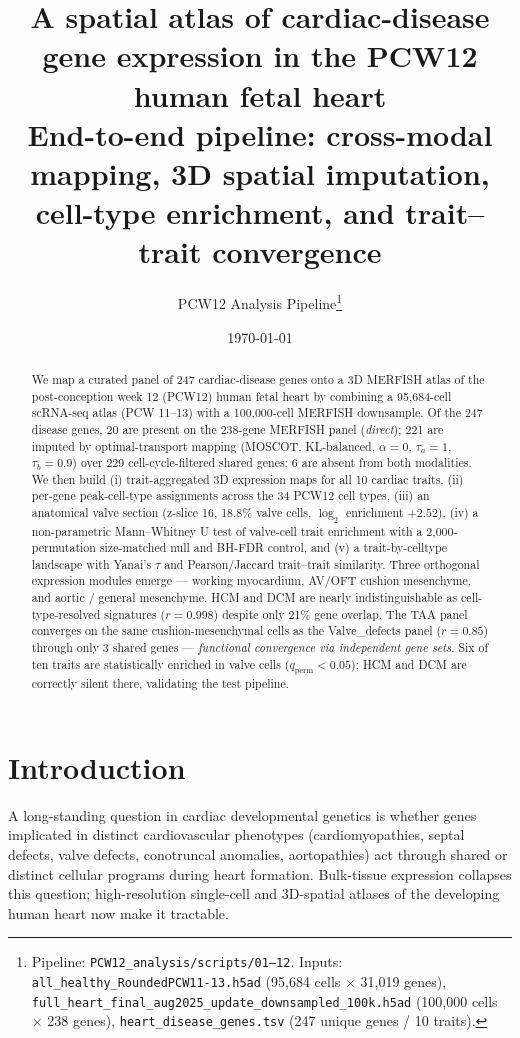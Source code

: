 \documentclass[11pt,a4paper]{article}
\title{\vspace{-1.5em}\textbf{A spatial atlas of cardiac-disease gene expression in the
PCW12 human fetal heart}\\[2pt]\large
End-to-end pipeline: cross-modal mapping, 3D spatial imputation,
cell-type enrichment, and trait--trait convergence}
\author{PCW12 Analysis Pipeline\thanks{Pipeline:
\texttt{PCW12\_analysis/scripts/01--12}.
Inputs: \texttt{all\_healthy\_RoundedPCW11-13.h5ad} (95{,}684 cells $\times$ 31{,}019 genes),
\texttt{full\_heart\_final\_aug2025\_update\_downsampled\_100k.h5ad} (100{,}000 cells $\times$ 238 genes),
\texttt{heart\_disease\_genes.tsv} (247 unique genes / 10 traits).}}
\date{\today}
\begin{document}
\maketitle

\begin{abstract}
\noindent We map a curated panel of 247 cardiac-disease genes onto a
3D MERFISH atlas of the post-conception week 12 (PCW12) human fetal heart
by combining a 95{,}684-cell scRNA-seq atlas (PCW 11--13) with a
100{,}000-cell MERFISH downsample. Of the 247 disease genes, 20 are
present on the 238-gene MERFISH panel (\emph{direct}); 221 are imputed by
optimal-transport mapping (MOSCOT, KL-balanced, $\alpha=0$,
$\tau_a=1$, $\tau_b=0.9$) over 229 cell-cycle-filtered shared genes;
6 are absent from both modalities. We then build (i) trait-aggregated 3D
expression maps for all 10 cardiac traits, (ii) per-gene peak-cell-type
assignments across the 34 PCW12 cell types, (iii) an anatomical valve
section (z-slice 16, 18.8\% valve cells, $\log_2$ enrichment $+2.52$),
(iv) a non-parametric Mann--Whitney U test of valve-cell trait
enrichment with a 2{,}000-permutation size-matched null and BH-FDR
control, and (v) a trait-by-celltype landscape with Yanai's $\tau$ and
Pearson/Jaccard trait--trait similarity. Three orthogonal expression
modules emerge --- working myocardium, AV/OFT cushion mesenchyme, and
aortic / general mesenchyme. HCM and DCM are nearly indistinguishable as
cell-type-resolved signatures ($r=0.998$) despite only 21\% gene
overlap. The TAA panel converges on the same cushion-mesenchymal cells
as the Valve\_defects panel ($r=0.85$) through only 3 shared genes ---
\emph{functional convergence via independent gene sets}. Six of ten
traits are statistically enriched in valve cells ($q_{\text{perm}}<0.05$);
HCM and DCM are correctly silent there, validating the test pipeline.
\end{abstract}

\section{Introduction}
\label{sec:intro}

A long-standing question in cardiac developmental genetics is whether
genes implicated in distinct cardiovascular phenotypes
(cardiomyopathies, septal defects, valve defects, conotruncal anomalies,
aortopathies) act through shared or distinct cellular programs during
heart formation. Bulk-tissue expression collapses this question;
high-resolution single-cell and 3D-spatial atlases of the developing
human heart now make it tractable.
\end{document}
